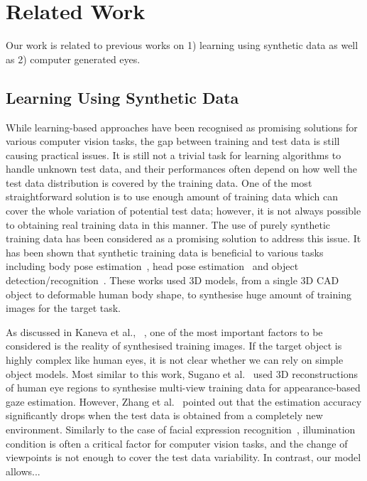 
\section{Related Work}

Our work is related to previous works on 1) learning using synthetic data as well as 2) computer generated eyes.

\subsection{Learning Using Synthetic Data}

While learning-based approaches have been recognised as promising solutions for various computer vision tasks, the gap between training and test data is still causing practical issues.
It is still not a trivial task for learning algorithms to handle unknown test data, and their performances often depend on how well the test data distribution is covered by the training data.
One of the most straightforward solution is to use enough amount of training data which can cover the whole variation of potential test data; however, it is not always possible to obtaining real training data in this manner.
The use of purely synthetic training data has been considered as a promising solution to address this issue.
It has been shown that synthetic training data is beneficial to various tasks including body pose estimation~\cite{shakhnarovich2003fast,okada2008relevant,shotton2013real}, head pose estimation~\cite{fanelli2011real} and object detection/recognition~\cite{yu2010improving,liebelt2010multiview,jaderberg2014synthetic}.
These works used 3D models, from a single 3D CAD object to deformable human body shape, to synthesise huge amount of training images for the target task.

As discussed in Kaneva et al.,~\cite{kaneva2011evaluation} , one of the most important factors to be considered is the reality of synthesised training images.
If the target object is highly complex like human eyes, it is not clear whether we can rely on simple object models.
Most similar to this work, Sugano et al.~\cite{sugano2014learning} used 3D reconstructions of human eye regions to synthesise multi-view training data for appearance-based gaze estimation.
However, Zhang et al.~\cite{zhang15_cvpr} pointed out that the estimation accuracy significantly drops when the test data is obtained from a completely new environment.
Similarly to the case of facial expression recognition~\cite{stratou2011effect}, illumination condition is often a critical factor for computer vision tasks, and the change of viewpoints is not enough to cover the test data variability.
In contrast, our model allows...

